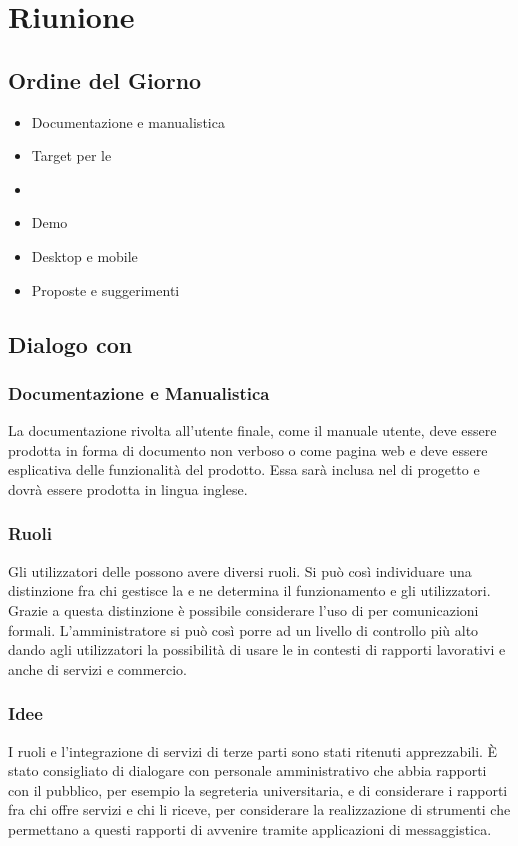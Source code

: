 \section{Riunione}
\subsection{Ordine del Giorno}
\begin{itemize}
	\item Documentazione e manualistica
	\item Target per le 
	\item {}
	\item Demo
	\item Desktop e mobile
	\item Proposte e suggerimenti
\end{itemize}

\subsection{Dialogo con \Proponente}
\subsubsection{Documentazione e Manualistica}
La documentazione rivolta all'utente finale, come il manuale utente, deve  essere prodotta in forma di documento non verboso o come pagina web e deve essere esplicativa delle funzionalità del prodotto. 
Essa sarà inclusa nel  di progetto e dovrà essere prodotta in lingua inglese.

\subsubsection{Ruoli}
Gli utilizzatori delle  possono avere diversi ruoli. Si può così individuare una distinzione fra chi gestisce la  e ne determina il funzionamento e gli utilizzatori.
Grazie a questa distinzione è possibile considerare l'uso di  per comunicazioni formali. 
L'amministratore si può così porre ad un livello di controllo più alto dando agli utilizzatori la possibilità di usare le  in contesti di rapporti lavorativi e anche di servizi e commercio.

\subsubsection{Idee}
I ruoli e l'integrazione di servizi di terze parti sono stati ritenuti apprezzabili.
\`{E} stato consigliato di dialogare con personale amministrativo che abbia rapporti con il pubblico, per esempio la segreteria universitaria, e di considerare i rapporti fra chi offre servizi e chi li riceve, per considerare la realizzazione di strumenti che permettano a questi rapporti di avvenire tramite applicazioni di messaggistica.  

